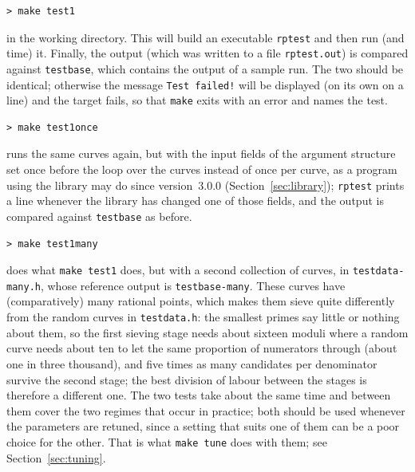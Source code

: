 \documentclass[12pt,a4paper,oneside]{amsart}
\begin{document}
\begin{verbatim}
> make test1
\end{verbatim}

in the working directory. This will build an executable \texttt{rptest} and
then run (and time) it. Finally, the output (which was written to a file
\texttt{rptest.out}) is compared against \texttt{testbase}, which contains the
output of a sample run. The two should be identical; otherwise the
message \texttt{Test failed!} will be displayed (on its own on a line) and
the target fails, so that \texttt{make} exits with an error and names the
test.

\begin{verbatim}
> make test1once
\end{verbatim}
runs the same curves again, but with the input fields of the argument
structure set once before the loop over the curves instead of once per
curve, as a program using the library may do since version~3.0.0
(Section~\ref{sec:library}); \texttt{rptest} prints a line whenever the
library has changed one of those fields, and the output is compared
against \texttt{testbase} as before.

\begin{verbatim}
> make test1many
\end{verbatim}
does what \texttt{make test1} does, but with a second collection of curves, in
\texttt{testdata-many.h}, whose reference output is \texttt{testbase-many}.
These curves have (comparatively) many rational points, which makes them
sieve quite differently from the random curves in \texttt{testdata.h}: the
smallest primes say little or nothing about them, so the first sieving stage
needs about sixteen moduli where a random curve needs about ten to let the
same proportion of numerators through (about one in three thousand), and
five times as many candidates per denominator survive the second stage; the
best division of labour between the stages is therefore a different one. The
two tests take about the same time and
between them cover the two regimes that occur in practice; both should be used
whenever the parameters are retuned, since a setting that suits one of them can
be a poor choice for the other. That is what \texttt{make tune} does with them;
see Section~\ref{sec:tuning}.
\end{document}
